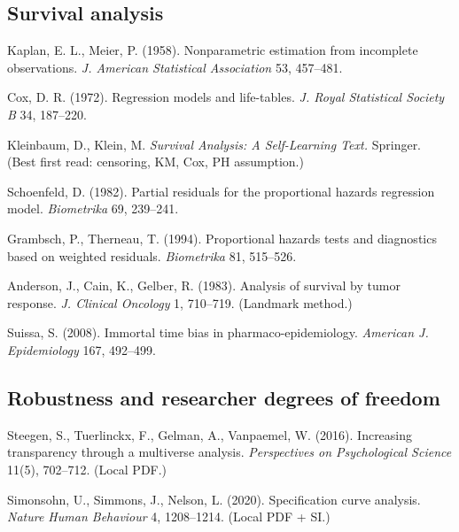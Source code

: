 \documentclass[11pt,a4paper]{article}
\begin{document}
\subsection*{Survival analysis}
\begin{enumerate}[label={[\arabic*]},ref=\arabic*,resume=refs]
  \item\label{ref:km} Kaplan, E. L., Meier, P. (1958). Nonparametric estimation from incomplete observations. \emph{J. American Statistical Association} 53, 457--481.
  \item\label{ref:cox} Cox, D. R. (1972). Regression models and life-tables. \emph{J. Royal Statistical Society B} 34, 187--220.
  \item\label{ref:kleinbaum} Kleinbaum, D., Klein, M. \emph{Survival Analysis: A Self-Learning Text.} Springer. (Best first read: censoring, KM, Cox, PH assumption.)
  \item\label{ref:schoenfeld} Schoenfeld, D. (1982). Partial residuals for the proportional hazards regression model. \emph{Biometrika} 69, 239--241.
  \item\label{ref:grambsch} Grambsch, P., Therneau, T. (1994). Proportional hazards tests and diagnostics based on weighted residuals. \emph{Biometrika} 81, 515--526.
  \item\label{ref:anderson} Anderson, J., Cain, K., Gelber, R. (1983). Analysis of survival by tumor response. \emph{J. Clinical Oncology} 1, 710--719. (Landmark method.)
  \item\label{ref:suissa} Suissa, S. (2008). Immortal time bias in pharmaco-epidemiology. \emph{American J. Epidemiology} 167, 492--499.
\end{enumerate}

\subsection*{Robustness and researcher degrees of freedom}
\begin{enumerate}[label={[\arabic*]},ref=\arabic*,resume=refs]
  \item\label{ref:steegen} Steegen, S., Tuerlinckx, F., Gelman, A., Vanpaemel, W. (2016). Increasing transparency through a multiverse analysis. \emph{Perspectives on Psychological Science} 11(5), 702--712. (Local PDF.)
  \item\label{ref:simonsohn} Simonsohn, U., Simmons, J., Nelson, L. (2020). Specification curve analysis. \emph{Nature Human Behaviour} 4, 1208--1214. (Local PDF + SI.)
\end{enumerate}
\end{document}

